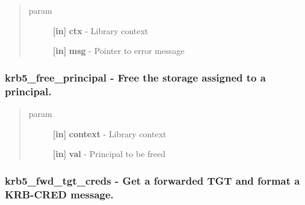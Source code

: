 \documentclass[letterpaper,10pt,english]{sphinxmanual}
\begin{document}
\begin{fulllineitems}
\label{appdev/refs/api/krb5_free_error_message:c.krb5_free_error_message}
\end{fulllineitems}

\begin{quote}\begin{description}
\item[{param}] \leavevmode
\textbf{{[}in{]}} \textbf{ctx} - Library context

\textbf{{[}in{]}} \textbf{msg} - Pointer to error message

\end{description}\end{quote}


\subsubsection{krb5\_free\_principal -  Free the storage assigned to a principal.}
\label{appdev/refs/api/krb5_free_principal::doc}\label{appdev/refs/api/krb5_free_principal:krb5-free-principal-free-the-storage-assigned-to-a-principal}

\begin{fulllineitems}
\label{appdev/refs/api/krb5_free_principal:c.krb5_free_principal}
\end{fulllineitems}

\begin{quote}\begin{description}
\item[{param}] \leavevmode
\textbf{{[}in{]}} \textbf{context} - Library context

\textbf{{[}in{]}} \textbf{val} - Principal to be freed

\end{description}\end{quote}


\subsubsection{krb5\_fwd\_tgt\_creds -  Get a forwarded TGT and format a KRB-CRED message.}
\label{appdev/refs/api/krb5_fwd_tgt_creds:krb5-fwd-tgt-creds-get-a-forwarded-tgt-and-format-a-krb-cred-message}\label{appdev/refs/api/krb5_fwd_tgt_creds::doc}
\end{document}

